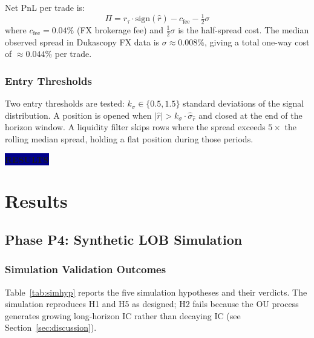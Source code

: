\documentclass[12pt,a4paper]{article}
\theoremstyle{definition}
\theoremstyle{remark}
\newcommand{\sectionlabel}[1]{%
  \begin{center}
    \colorbox{darkblue}{\color{white}\bfseries\large\quad #1 \quad}
  \end{center}
  \vspace{4pt}
}
\begin{document}
Net PnL per trade is:
\begin{equation}
  \Pi = r_\tau \cdot \mathrm{sign}(\hat{r}) - c_\mathrm{fee}
    - \tfrac{1}{2}\sigma
\label{eq:pnl}
\end{equation}
where $c_\mathrm{fee} = 0.04\%$ (FX brokerage fee) and
$\frac{1}{2}\sigma$ is the half-spread cost. The median observed
spread in Dukascopy FX data is $\sigma \approx 0.008\%$, giving a
total one-way cost of ${\approx}0.044\%$ per trade.

\subsubsection{Entry Thresholds}

Two entry thresholds are tested:
$k_\sigma \in \{0.5, 1.5\}$ standard deviations of the signal
distribution. A position is opened when
$|\hat{r}| > k_\sigma \cdot \hat{\sigma}_{\hat{r}}$ and closed
at the end of the horizon window. A liquidity filter skips rows where
the spread exceeds $5\times$ the rolling median spread, holding a flat
position during those periods.

\newpage
\sectionlabel{RESULTS}

\section{Results}
\label{sec:results}

\subsection{Phase P4: Synthetic LOB Simulation}
\label{sec:sim_results}

\subsubsection{Simulation Validation Outcomes}

Table~\ref{tab:simhyp} reports the five simulation hypotheses and
their verdicts. The simulation reproduces H1 and H5 as designed; H2
fails because the OU process generates growing long-horizon IC rather
than decaying IC (see Section~\ref{sec:discussion}).
\end{document}
